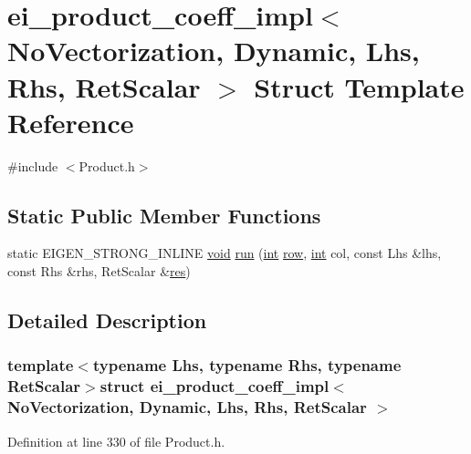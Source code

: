\hypertarget{structei__product__coeff__impl_3_01_no_vectorization_00_01_dynamic_00_01_lhs_00_01_rhs_00_01_ret_scalar_01_4}{\section{ei\-\_\-product\-\_\-coeff\-\_\-impl$<$ No\-Vectorization, Dynamic, Lhs, Rhs, Ret\-Scalar $>$ Struct Template Reference}
\label{structei__product__coeff__impl_3_01_no_vectorization_00_01_dynamic_00_01_lhs_00_01_rhs_00_01_ret_scalar_01_4}
}


{\ttfamily \#include $<$Product.\-h$>$}

\subsection*{Static Public Member Functions}
\begin{DoxyCompactItemize}
\item 
static E\-I\-G\-E\-N\-\_\-\-S\-T\-R\-O\-N\-G\-\_\-\-I\-N\-L\-I\-N\-E \hyperlink{group___u_a_v_objects_plugin_ga444cf2ff3f0ecbe028adce838d373f5c}{void} \hyperlink{structei__product__coeff__impl_3_01_no_vectorization_00_01_dynamic_00_01_lhs_00_01_rhs_00_01_ret_scalar_01_4_a8bb462ad59345d76df66f4d9ff016005}{run} (\hyperlink{ioapi_8h_a787fa3cf048117ba7123753c1e74fcd6}{int} \hyperlink{glext_8h_a11b277b422822f784ee248b43eee3e1e}{row}, \hyperlink{ioapi_8h_a787fa3cf048117ba7123753c1e74fcd6}{int} col, const Lhs \&lhs, const Rhs \&rhs, Ret\-Scalar \&\hyperlink{glext_8h_a1dbb21208b9047cc8031ca9c840d3c2f}{res})
\end{DoxyCompactItemize}


\subsection{Detailed Description}
\subsubsection*{template$<$typename Lhs, typename Rhs, typename Ret\-Scalar$>$struct ei\-\_\-product\-\_\-coeff\-\_\-impl$<$ No\-Vectorization, Dynamic, Lhs, Rhs, Ret\-Scalar $>$}



Definition at line 330 of file Product.\-h.




